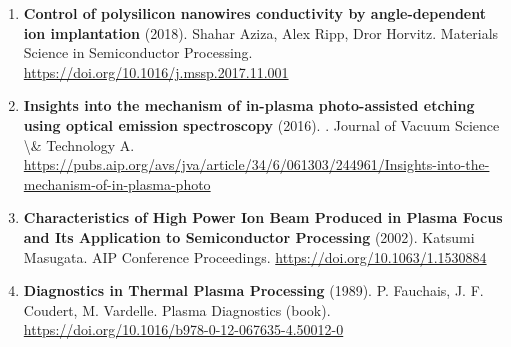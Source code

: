 \documentclass[11pt,a4paper]{article}
\begin{document}
\begin{enumerate}[leftmargin=1.4em]
\item \textbf{Control of polysilicon nanowires conductivity by angle-dependent ion implantation} (2018). Shahar Aziza, Alex Ripp, Dror Horvitz. Materials Science in Semiconductor Processing. \url{https://doi.org/10.1016/j.mssp.2017.11.001}
\item \textbf{Insights into the mechanism of in-plasma photo-assisted etching using optical emission spectroscopy} (2016). . Journal of Vacuum Science \textbackslash{}\& Technology A. \url{https://pubs.aip.org/avs/jva/article/34/6/061303/244961/Insights-into-the-mechanism-of-in-plasma-photo}
\item \textbf{Characteristics of High Power Ion Beam Produced in Plasma Focus and Its Application to Semiconductor Processing} (2002). Katsumi Masugata. AIP Conference Proceedings. \url{https://doi.org/10.1063/1.1530884}
\item \textbf{Diagnostics in Thermal Plasma Processing} (1989). P. Fauchais, J. F. Coudert, M. Vardelle. Plasma Diagnostics (book). \url{https://doi.org/10.1016/b978-0-12-067635-4.50012-0}
\end{enumerate}
\end{document}
